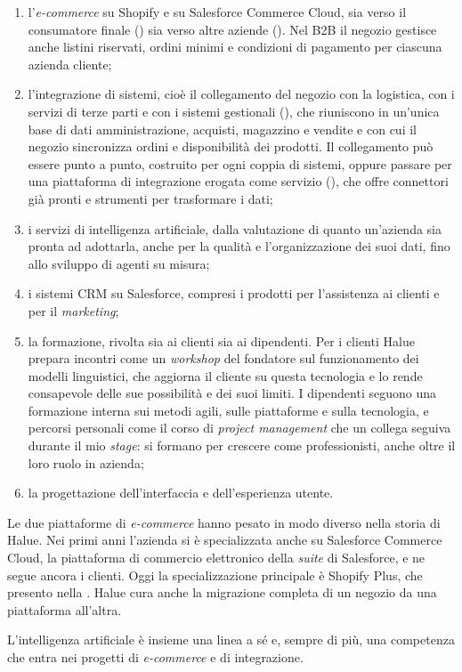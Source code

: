 \begin{enumerate}
        \item l’\emph{e-commerce} su Shopify e su Salesforce Commerce Cloud, sia verso il
	consumatore finale () sia verso altre aziende (). Nel B2B il
	negozio gestisce anche listini riservati, ordini minimi e condizioni di pagamento per ciascuna
	azienda cliente;
        \item l’integrazione di sistemi, cioè il collegamento del negozio con la logistica, con i
	servizi di terze parti e con i sistemi gestionali (), che riuniscono in un’unica
	base di dati amministrazione, acquisti, magazzino e vendite e con cui il negozio sincronizza ordini
	e disponibilità dei prodotti. Il collegamento può essere punto a punto, costruito per ogni coppia di
	sistemi, oppure passare per una piattaforma di integrazione erogata come servizio
	(), che offre connettori già pronti e strumenti per trasformare i dati;
        \item i servizi di intelligenza artificiale, dalla valutazione di quanto un’azienda sia
	pronta ad adottarla, anche per la qualità e l’organizzazione dei suoi dati, fino allo sviluppo di
	agenti su misura;
	\item i sistemi CRM su Salesforce, compresi i prodotti per l’assistenza ai clienti e per il
	\emph{marketing};
	\item la formazione, rivolta sia ai clienti sia ai dipendenti. Per i clienti Halue prepara
	incontri come un \emph{workshop} del fondatore sul funzionamento dei modelli linguistici, che
	aggiorna il cliente su questa tecnologia e lo rende consapevole delle sue possibilità e dei suoi
	limiti. I dipendenti seguono una formazione interna sui metodi agili, sulle piattaforme e sulla
	tecnologia, e percorsi personali come il corso di \emph{project management} che un collega
	seguiva durante il mio \emph{stage}: si formano per crescere come professionisti, anche oltre il
	loro ruolo in azienda;
	\item la progettazione dell’interfaccia e dell’esperienza utente.
\end{enumerate}

Le due piattaforme di \emph{e-commerce} hanno pesato in modo diverso nella storia di Halue. Nei
primi anni l’azienda si è specializzata anche su Salesforce Commerce Cloud, la piattaforma di
commercio elettronico della \emph{suite} di Salesforce, e ne segue ancora i clienti. Oggi la
specializzazione principale è Shopify Plus, che presento nella . Halue cura
anche la migrazione completa di un negozio da una piattaforma all’altra.

L’intelligenza artificiale è insieme una linea a sé e, sempre di più, una competenza che entra
nei progetti di \emph{e-commerce} e di integrazione.
